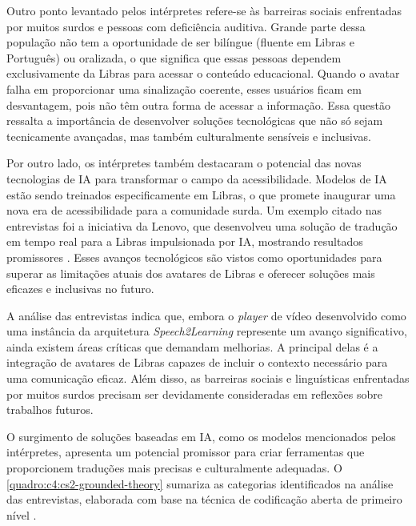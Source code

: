 Outro ponto levantado pelos intérpretes refere-se às barreiras sociais enfrentadas por muitos surdos e pessoas com deficiência auditiva. Grande parte dessa população não tem a oportunidade de ser bilíngue (fluente em Libras e Português) ou oralizada, o que significa que essas pessoas dependem exclusivamente da Libras para acessar o conteúdo educacional. Quando o avatar falha em proporcionar uma sinalização coerente, esses usuários ficam em desvantagem, pois não têm outra forma de acessar a informação. Essa questão ressalta a importância de desenvolver soluções tecnológicas que não só sejam tecnicamente avançadas, mas também culturalmente sensíveis e inclusivas.

Por outro lado, os intérpretes também destacaram o potencial das novas tecnologias de IA para transformar o campo da acessibilidade. Modelos de IA estão sendo treinados especificamente em Libras, o que promete inaugurar uma nova era de acessibilidade para a comunidade surda. Um exemplo citado nas entrevistas foi a iniciativa da Lenovo, que desenvolveu uma solução de tradução em tempo real para a Libras impulsionada por IA, mostrando resultados promissores \cite{Lenovo2023}. Esses avanços tecnológicos são vistos como oportunidades para superar as limitações atuais dos avatares de Libras e oferecer soluções mais eficazes e inclusivas no futuro.

A análise das entrevistas indica que, embora o \textit{player} de vídeo desenvolvido como uma instância da arquitetura \textit{Speech2Learning} represente um avanço significativo, ainda existem áreas críticas que demandam melhorias. A principal delas é a integração de avatares de Libras capazes de incluir o contexto necessário para uma comunicação eficaz. Além disso, as barreiras sociais e linguísticas enfrentadas por muitos surdos precisam ser devidamente consideradas em reflexões sobre trabalhos futuros. 

O surgimento de soluções baseadas em IA, como os modelos mencionados pelos intérpretes, apresenta um potencial promissor para criar ferramentas que proporcionem traduções mais precisas e culturalmente adequadas. O \autoref{quadro:c4:cs2-grounded-theory} sumariza as categorias identificados na análise das entrevistas, elaborada com base na técnica de codificação aberta de primeiro nível \cite{Martinelli2023}.

